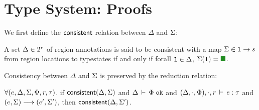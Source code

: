 \section{Type System: Proofs}

We first define the ${\sf consistent}$ relation between $\Delta$ and
$\mem$:

\begin{definition}[\consistent($\Delta$,$\mem$)]
A set $\Delta \in 2^{r}$ of region annotations is said to be
consistent with a map $\Sigma \in \mathtt{l} \rightarrow s$ from region
locations to typestates if and only if forall $\mathtt{l}\in\Delta$,
$\mem(\loc) = \LIVE$.
\end{definition}

Consistency between $\Delta$ and $\mem$ is preserved by the reduction
relation:

\begin{lemma}
\label{lem:consistency}
$\forall(e,\Delta,\Sigma,\Phi,r,\tau)$. if ${\sf consistent}(\Delta,\Sigma)$
and $\Delta\,\vdash\,\Phi \; \texttt{ok}$ %
and $(\Delta,\cdot,\Phi),\cdot,r\,\vdash\,e:\tau$ 
and $(e,\Sigma) \longrightarrow (e',\Sigma')$, then
${\sf consistent}(\Delta,\Sigma')$.
\end{lemma}
